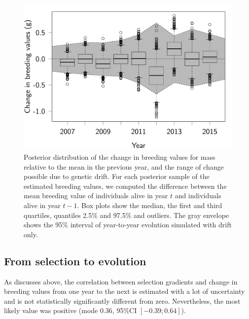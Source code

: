 \begin{figure}[ht]
\includegraphics[width=\textwidth]{FiguresFluSel/EvolDiff-1}
\caption{Posterior distribution of the change in breeding values for mass relative to the mean in the previous year, and the range of change possible due to genetic drift. For each posterior sample of the estimated breeding values, we computed the difference between the mean breeding value of individuals alive in year $t$ and individuals alive in year $t-1$. Box plots show the median, the first and third quartiles, quantiles 2.5\% and 97.5\% and outliers. The gray envelope shows the 95\% interval of year-to-year evolution simulated with drift only.}
\label{fig:evoldiff}
\end{figure}

\subsection*{From selection to evolution}

As discusses above, the correlation between selection gradients and change in breeding values from one year to the next is estimated with a lot of uncertainty and is not statistically significantly different from zero. Nevertheless, the most likely value was positive (mode 0.36, 95\%CI $[-0.39; 0.64]$).

